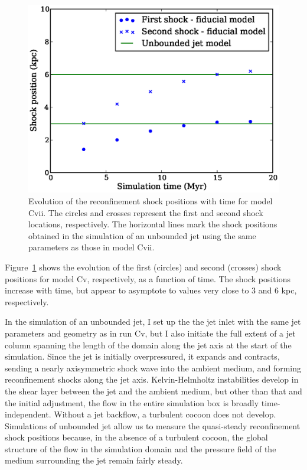 \begin{figure}
\includegraphics[width=\linewidth]{nse.eps}
\caption{Evolution of the reconfinement shock positions with time for model Cvii. The circles and crosses represent the first and second shock locations, respectively. The horizontal lines mark the shock positions obtained in the simulation of an unbounded jet using the same parameters as those in model Cvii.}
\label{f:c_vs_n}
\end{figure}

Figure~\ref{f:c_vs_n} shows the evolution of the first (circles) and second (crosses) shock positions for model Cv, respectively, as a function of time. The shock positions increase with time, but appear to asymptote to values very close to 3 and 6 kpc, respectively.

In the simulation of an unbounded jet, I set up the the jet inlet with the same jet parameters and geometry as in run Cv, but I also initiate the full extent of a jet column spanning the length of the domain along the jet axis at the start of the simulation. Since the jet is initially overpressured, it expands and contracts, sending a nearly axisymmetric shock wave into the ambient medium, and forming reconfinement shocks along the jet axis. Kelvin-Helmholtz instabilities develop in the shear layer between the jet and the ambient medium, but other than that and the initial adjustment, the flow in the entire simulation box is broadly time-independent. Without a jet backflow, a turbulent cocoon does not develop. Simulations of unbounded jet allow us to measure the quasi-steady reconfinement shock positions because, in the absence of a turbulent cocoon, the global structure of the flow in the simulation domain and the pressure field of the medium surrounding the jet remain fairly steady.

